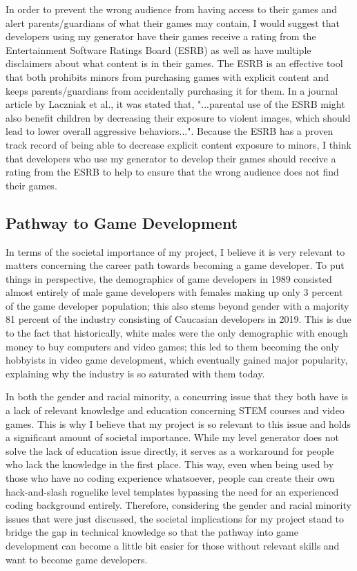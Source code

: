 \documentclass[10pt,twocolumn]{article}
\begin{document}
In order to prevent the wrong audience from having access to their games and alert parents/guardians of what their games may contain, I would suggest that developers using my generator have their games receive a rating from the Entertainment Software Ratings Board (ESRB) as well as have multiple disclaimers about what content is in their games. The ESRB is an effective tool that both prohibits minors from purchasing games with explicit content and keeps parents/guardians from accidentally purchasing it for them. In a journal article by Laczniak et al., it was stated that, "...parental use of the ESRB might also benefit children by decreasing their exposure to violent images, which should lead to lower overall aggressive behaviors..."\cite{laczniak2017parental}. Because the ESRB has a proven track record of being able to decrease explicit content exposure to minors, I think that developers who use my generator to develop their games should receive a rating from the ESRB to help to ensure that the wrong audience does not find their games.

\subsection{Pathway to Game Development}

In terms of the societal importance of my project, I believe it is very relevant to matters concerning the career path towards becoming a game developer. To put things in perspective, the demographics of game developers in 1989 consisted almost entirely of male game developers with females making up only 3 percent of the game developer population\cite{graser2013videogame}; this also stems beyond gender with a majority 81 percent of the industry consisting of Caucasian  developers in 2019\cite{weststar2019survey}. This is due to the fact that historically, white males were the only demographic with enough money to buy computers and video games; this led to them becoming the only hobbyists in video game development, which eventually gained major popularity, explaining why the industry is so saturated with them today. 

In both the gender and racial minority, a concurring issue that they both have is a lack of relevant knowledge and education concerning STEM courses and video games\cite{ramanan2017issue}. This is why I believe that my project is so relevant to this issue and holds a significant amount of societal importance. While my level generator does not solve the lack of education issue directly, it serves as a workaround for people who lack the knowledge in the first place. This way, even when being used by those who have no coding experience whatsoever, people can create their own hack-and-slash roguelike level templates bypassing the need for an experienced coding background entirely. Therefore, considering the gender and racial minority issues that were just discussed, the societal implications for my project stand to bridge the gap in technical knowledge so that the pathway into game development can become a little bit easier for those without relevant skills and want to become game developers. 
\end{document}
